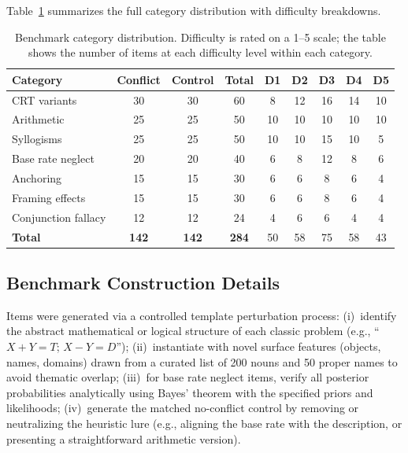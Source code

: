 Table~\ref{tab:category_detail} summarizes the full category distribution
with difficulty breakdowns.

\begin{table}[h]
\centering
\caption{Benchmark category distribution.  Difficulty is rated on a 1--5
  scale; the table shows the number of items at each difficulty level within
  each category.}
\label{tab:category_detail}
\vspace{4pt}
\small
\begin{tabular}{lcccccccc}
\toprule
\textbf{Category} & \textbf{Conflict} & \textbf{Control} & \textbf{Total}
  & \textbf{D1} & \textbf{D2} & \textbf{D3} & \textbf{D4} & \textbf{D5} \\
\midrule
CRT variants       & 30 & 30 & 60  &  8 & 12 & 16 & 14 & 10 \\
Arithmetic          & 25 & 25 & 50  & 10 & 10 & 10 & 10 & 10 \\
Syllogisms          & 25 & 25 & 50  & 10 & 10 & 15 & 10 &  5 \\
Base rate neglect   & 20 & 20 & 40  &  6 &  8 & 12 &  8 &  6 \\
Anchoring           & 15 & 15 & 30  &  6 &  6 &  8 &  6 &  4 \\
Framing effects     & 15 & 15 & 30  &  6 &  6 &  8 &  6 &  4 \\
Conjunction fallacy & 12 & 12 & 24  &  4 &  6 &  6 &  4 &  4 \\
\midrule
\textbf{Total}      & \textbf{142} & \textbf{142} & \textbf{284}
  & 50 & 58 & 75 & 58 & 43 \\
\bottomrule
\end{tabular}
\end{table}

\subsection{Benchmark Construction Details}

Items were generated via a controlled template perturbation process:
(i)~identify the abstract mathematical or logical structure of each
classic problem (e.g., ``$X + Y = T$; $X - Y = D$'');
(ii)~instantiate with novel surface features (objects, names, domains)
drawn from a curated list of 200 nouns and 50 proper names to avoid
thematic overlap;
(iii)~for base rate neglect items, verify all posterior probabilities
analytically using Bayes' theorem with the specified priors and
likelihoods;
(iv)~generate the matched no-conflict control by removing or neutralizing
the heuristic lure (e.g., aligning the base rate with the description, or
presenting a straightforward arithmetic version).

